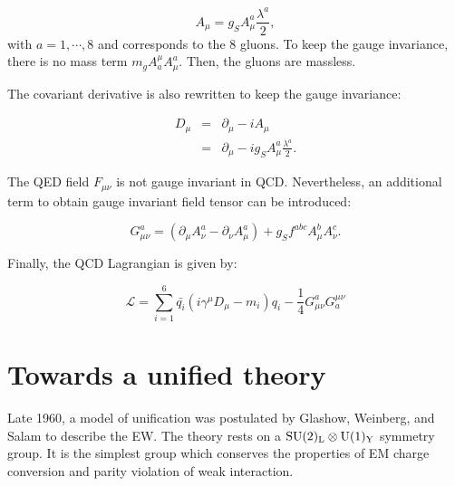     \begin{equation}
      A_{\mu} = g_S A^a_{\mu}\frac{\lambda^a}{2},
    \end{equation}
    with $a = 1,\cdots,8$ and corresponds to the 8 gluons.
    To keep the gauge invariance, there is no mass term $m_g A^{\mu}_a A^a_{\mu}$.
    Then, the gluons are massless. 

    The covariant derivative is also rewritten to keep the gauge invariance:

    \begin{equation}
      \begin{array}{rcl}
        D_{\mu} & = & \partial_{\mu} - i A_{\mu} \\
                & = & \partial_{\mu} - i g_S A^a_{\mu} \frac{\lambda^a}{2}.
      \end{array}
    \end{equation}

    The \gls{QED} field $F_{\mu \nu}$ is not gauge invariant in \gls{QCD}.
    Nevertheless, an additional term to obtain gauge invariant field tensor can be introduced:
    
    \begin{equation}
      G^a_{\mu \nu} = \left( \partial_{\mu} A^a_{\nu} - \partial_{\nu} A^a_{\mu} \right) + g_S f^{abc} A^b_{\mu} A^c_{\nu}.
    \end{equation} 

    Finally, the \gls{QCD} Lagrangian is given by:

    \begin{equation}
      \mathcal{L} = \sum_{i=1}^6  \bar{q_i} \left(i \gamma^{\mu}D_{\mu} -m_i \right)q_i - \frac{1}{4} G_{\mu \nu}^{a} G_{a}^{\mu \nu}
    \end{equation}
    
    \section{Towards a unified theory}

    Late 1960, a model of unification was postulated by Glashow, Weinberg, and Salam to describe the \acrfull{EW}.
    The theory rests on a  $\rm{SU}(2)_{\rm{L}} \otimes \rm{U}(1)_{\rm{Y}}$ symmetry group.
    It is the simplest group which conserves the properties of EM charge conversion and parity violation of weak interaction.

